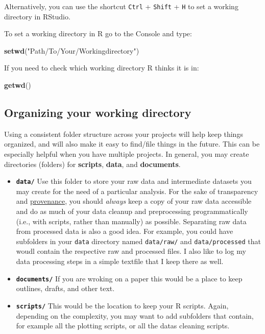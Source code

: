 \documentclass[]{book}
\newenvironment{Shaded}{\begin{snugshade}}{\end{snugshade}}
\newcommand{\KeywordTok}[1]{\textcolor[rgb]{0.13,0.29,0.53}{\textbf{#1}}}
\newcommand{\StringTok}[1]{\textcolor[rgb]{0.31,0.60,0.02}{#1}}
\newcommand{\NormalTok}[1]{#1}
\providecommand{\tightlist}{%
  \setlength{\itemsep}{0pt}\setlength{\parskip}{0pt}}
\theoremstyle{definition}
\theoremstyle{definition}
\theoremstyle{remark}
\begin{document}
Alternatively, you can use the shortcut \texttt{Ctrl} + \texttt{Shift} +
\texttt{H} to set a working directory in RStudio.

To set a working directory in R go to the Console and type:

\begin{Shaded}
\begin{Highlighting}[]
\KeywordTok{setwd}\NormalTok{(}\StringTok{"Path/To/Your/Workingdirectory"}\NormalTok{)}
\end{Highlighting}
\end{Shaded}

If you need to check which working directory R thinks it is in:

\begin{Shaded}
\begin{Highlighting}[]
\KeywordTok{getwd}\NormalTok{()}
\end{Highlighting}
\end{Shaded}

\subsection{Organizing your working
directory}\label{organizing-your-working-directory}

Using a consistent folder structure across your projects will help keep
things organized, and will also make it easy to find/file things in the
future. This can be especially helpful when you have multiple projects.
In general, you may create directories (folders) for \textbf{scripts},
\textbf{data}, and \textbf{documents}.

\begin{itemize}
\tightlist
\item
  \textbf{\texttt{data/}} Use this folder to store your raw data and
  intermediate datasets you may create for the need of a particular
  analysis. For the sake of transparency and
  \href{https://en.wikipedia.org/wiki/Provenance}{provenance}, you
  should \emph{always} keep a copy of your raw data accessible and do as
  much of your data cleanup and preprocessing programmatically (i.e.,
  with scripts, rather than manually) as possible. Separating raw data
  from processed data is also a good idea. For example, you could have
  subfolders in your \texttt{data} directory named \texttt{data/raw/}
  and \texttt{data/processed} that woudl contain the respective raw and
  processed files. I also like to log my data processing steps in a
  simple textfile that I keep there as well.
\item
  \textbf{\texttt{documents/}} If you are wroking on a paper this would
  be a place to keep outlines, drafts, and other text.
\item
  \textbf{\texttt{scripts/}} This would be the location to keep your R
  scripts. Again, depending on the complexity, you may want to add
  subfolders that contain, for example all the plotting scripts, or all
  the datas cleaning scripts.
\end{itemize}
\end{document}
